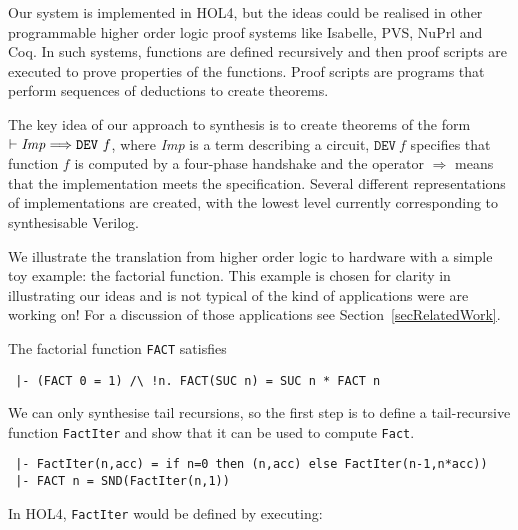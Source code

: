 
Our system is implemented in HOL4, but the ideas could be
realised in other programmable higher order logic proof systems like
Isabelle, PVS, NuPrl and Coq. In such systems, functions are defined
recursively and then proof scripts are executed to prove properties of
the functions.  Proof scripts are programs that perform sequences of
deductions to create theorems.

The key idea of our approach to synthesis is to create theorems of the
form $\vdash {\it{Imp}}\Longrightarrow\texttt{DEV}~f$, where
{\it{Imp}} is a term describing a circuit, $\texttt{DEV}~f$ specifies
that function $f$ is computed by a four-phase handshake and the
operator $\Longrightarrow$ means that the implementation meets the
specification.  Several different representations of implementations
are created, with the lowest level currently corresponding to
synthesisable Verilog.

We illustrate the translation from higher order logic to hardware with a
simple toy example: the factorial function. This example is chosen for
clarity in illustrating our ideas and is not typical of the kind of
applications were are working on!  For a discussion of those
applications see Section~\ref{secRelatedWork}.

The factorial function \texttt{FACT} satisfies

\vspace*{-2mm}

{\baselineskip10pt\begin{verbatim}
 |- (FACT 0 = 1) /\ !n. FACT(SUC n) = SUC n * FACT n
\end{verbatim}}

\vspace*{-2mm}
We can only synthesise tail recursions, so the first
step is to define a tail-recursive function \texttt{FactIter} and show
that it can be used to compute \texttt{Fact}.

\vspace*{-2mm}

{\baselineskip10pt\begin{verbatim}
 |- FactIter(n,acc) = if n=0 then (n,acc) else FactIter(n-1,n*acc))
 |- FACT n = SND(FactIter(n,1))
\end{verbatim}}

\vspace*{-2mm}

\noindent In HOL4, \texttt{FactIter} would be defined by executing:

\vspace*{-2mm}

